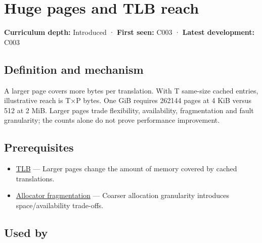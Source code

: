 \hypertarget{appendix-ce688d1acdab}{}\label{referencestart:appendix-ce688d1acdab}
\section{Huge pages and TLB reach}\label{appendix-ce688d1acdab-huge-pages-and-tlb-reach}

\hypertarget{appendix-ce688d1acdab-huge-pages-and-tlb-reach}{}

\textbf{Curriculum depth:} Introduced · \textbf{First seen:} C003 · \textbf{Latest development:} C003

\begin{allmightroledefinition}

\subsection{Definition and mechanism}\label{appendix-ce688d1acdab-definition-and-mechanism}

\hypertarget{appendix-ce688d1acdab-definition-and-mechanism}{}

A larger page covers more bytes per translation. With T same-size cached entries, illustrative reach is T×P bytes. One GiB requires 262144 pages at 4 KiB versus 512 at 2 MiB. Larger pages trade flexibility, availability, fragmentation and fault granularity; the counts alone do not prove performance improvement.

\end{allmightroledefinition}

\subsection{Prerequisites}\label{appendix-ce688d1acdab-prerequisites}

\hypertarget{appendix-ce688d1acdab-prerequisites}{}

\begin{itemize}
\tightlist
\item
  \hyperref[appendix-7a2d9c5ce511]{TLB} --- Larger pages change the amount of memory covered by cached translations.
\item
  \hyperref[appendix-a7c50686d81f]{Allocator fragmentation} --- Coarser allocation granularity introduces space/availability trade-offs.
\end{itemize}

\subsection{Used by}\label{appendix-ce688d1acdab-used-by}

